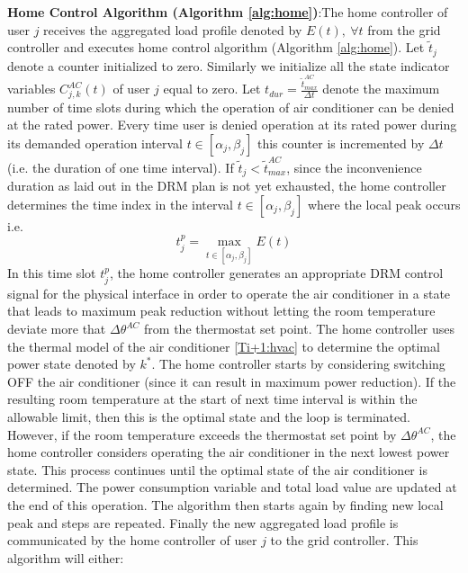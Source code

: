 \documentclass[10pt,twocolumn,twoside]{IEEEtran}
\begin{document}
\textbf{Home Control Algorithm (Algorithm \ref{alg:home})}:The home controller of user $j$ receives the aggregated load profile denoted by $E(t), \: \forall t$ from the grid controller and executes home control algorithm (Algorithm \ref{alg:home}). Let $\tilde{t}_j$ denote a counter initialized to zero. Similarly we initialize all the state indicator variables $C^{AC}_{j,k}(t)$ of user $j$ equal to zero. Let $t_{dur}=\frac{\tilde{t}^{AC}_{max}}{\Delta t}$ denote the maximum number of time slots during which the operation of air conditioner can be denied at the rated power. Every time user is denied operation at its rated power during its demanded operation interval $t\in [\alpha_j, \beta_j]$ this counter is incremented by $\Delta t$ (i.e. the duration of one time interval). If $\tilde{t}_j < \tilde{t}^{AC}_{max}$, since the inconvenience duration as laid out in the DRM plan is not yet exhausted, the home controller determines the time index in the interval $t\in [\alpha_j, \beta_j]$ where the local peak occurs i.e. 
\[t_j^p=\max_{t\in [\alpha_j, \beta_j]} E(t) \]
In this time slot $t_j^p$, the home controller generates an appropriate DRM control signal for the physical interface in order to operate the air conditioner in a state that leads to maximum peak reduction without letting the room temperature deviate more that $\Delta{\theta^{AC}}$ from the thermostat set point. The home controller uses the thermal model of the air conditioner \eqref{Ti+1:hvac} to determine the optimal power state denoted by $k^*$. The home controller starts by considering switching OFF the air conditioner (since it can result in maximum power reduction). If the resulting room temperature at the start of next time interval is within the allowable limit, then this is the optimal state and the loop is terminated. However, if the room temperature exceeds the thermostat set point by $\Delta{\theta^{AC}}$, the home controller considers operating the air conditioner in the next lowest power state. This process continues until the optimal state of the air conditioner is determined. The power consumption variable and total load value are updated at the end of this operation. The algorithm then starts again by finding new local peak and steps are repeated. Finally the new aggregated load profile is communicated by the home controller of user $j$ to the grid controller.
This algorithm will either: 
\end{document}
